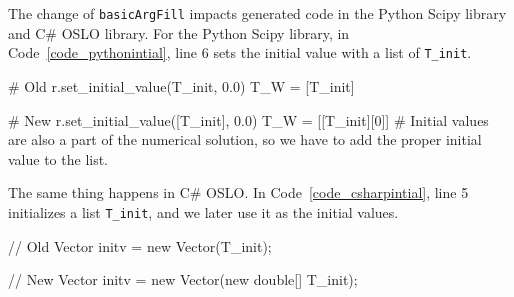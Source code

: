 




The change of \verb|basicArgFill| impacts generated code in the Python Scipy library and C\# OSLO library. For the Python Scipy library, in Code~\ref{code_pythonintial}, line 6 sets the initial value with a list of \verb|T_init|.

\begin{listing}
\begin{python1}
# Old 
  r.set_initial_value(T_init, 0.0)
  T_W = [T_init]

# New 
  r.set_initial_value([T_init], 0.0)
  T_W = [[T_init][0]] # Initial values are also a part of the numerical solution, so we have to add the proper initial value to the list.
\end{python1}
\label{code_pythonintial}
\end{listing}
The same thing happens in C\# OSLO. In Code~\ref{code_csharpintial}, line 5 initializes a list \verb|T_init|, and we later use it as the initial values.  
\begin{listing}[ht]
\begin{csharp1}
// Old 
Vector initv = new Vector(T_init);

// New 
Vector initv = new Vector(new double[] {T_init});
\end{csharp1}
\label{code_csharpintial}
\end{listing}

